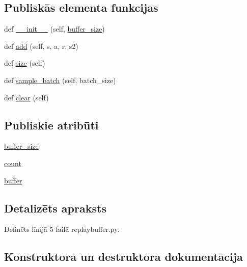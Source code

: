\subsection*{Publiskās elementa funkcijas}
\begin{DoxyCompactItemize}
\item 
def \hyperlink{classreplaybuffer_1_1_replay_buffer_ad9df73a40ff390fb1dab7f0bc4deb816}{\+\_\+\+\_\+init\+\_\+\+\_\+} (self, \hyperlink{classreplaybuffer_1_1_replay_buffer_a86681e04166a4ee274542f57ddd1a12b}{buffer\+\_\+size})
\item 
def \hyperlink{classreplaybuffer_1_1_replay_buffer_aa47eed5f5365313a32d8a18b486d06ac}{add} (self, s, a, r, s2)
\item 
def \hyperlink{classreplaybuffer_1_1_replay_buffer_a88315be96866304cdd1d3ac57e7ffebb}{size} (self)
\item 
def \hyperlink{classreplaybuffer_1_1_replay_buffer_aea98cc353ae15cd58f285b49f88e1dc7}{sample\+\_\+batch} (self, batch\+\_\+size)
\item 
def \hyperlink{classreplaybuffer_1_1_replay_buffer_a882965a63e7dde4fc7c23c974be17c01}{clear} (self)
\end{DoxyCompactItemize}
\subsection*{Publiskie atribūti}
\begin{DoxyCompactItemize}
\item 
\hyperlink{classreplaybuffer_1_1_replay_buffer_a86681e04166a4ee274542f57ddd1a12b}{buffer\+\_\+size}
\item 
\hyperlink{classreplaybuffer_1_1_replay_buffer_a9a4f50b29294de06ab6f42b0403b7e1e}{count}
\item 
\hyperlink{classreplaybuffer_1_1_replay_buffer_ae1fc312917fad747d402f0f103e20061}{buffer}
\end{DoxyCompactItemize}


\subsection{Detalizēts apraksts}


Definēts līnijā 5 failā replaybuffer.\+py.



\subsection{Konstruktora un destruktora dokumentācija}
